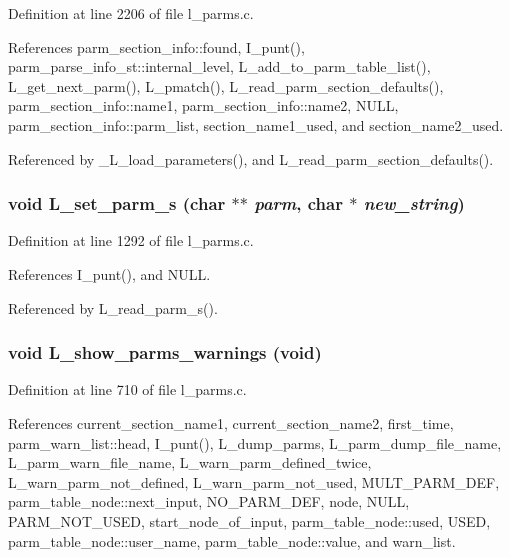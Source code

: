 Definition at line 2206 of file l\_\-parms.c.

References parm\_\-section\_\-info::found, I\_\-punt(), parm\_\-parse\_\-info\_\-st::internal\_\-level, L\_\-add\_\-to\_\-parm\_\-table\_\-list(), L\_\-get\_\-next\_\-parm(), L\_\-pmatch(), L\_\-read\_\-parm\_\-section\_\-defaults(), parm\_\-section\_\-info::name1, parm\_\-section\_\-info::name2, NULL, parm\_\-section\_\-info::parm\_\-list, section\_\-name1\_\-used, and section\_\-name2\_\-used.

Referenced by \_\-L\_\-load\_\-parameters(), and L\_\-read\_\-parm\_\-section\_\-defaults().
\subsubsection{\setlength{\rightskip}{0pt plus 5cm}void L\_\-set\_\-parm\_\-s (char $\ast$$\ast$ {\em parm}, char $\ast$ {\em new\_\-string})}\label{l__parms_8c_d2ff90330481ecb555f26f90a1d3c152}




Definition at line 1292 of file l\_\-parms.c.

References I\_\-punt(), and NULL.

Referenced by L\_\-read\_\-parm\_\-s().
\subsubsection{\setlength{\rightskip}{0pt plus 5cm}void L\_\-show\_\-parms\_\-warnings (void)}\label{l__parms_8c_f725b05a5b630bdea7d8b719c8f50f61}




Definition at line 710 of file l\_\-parms.c.

References current\_\-section\_\-name1, current\_\-section\_\-name2, first\_\-time, parm\_\-warn\_\-list::head, I\_\-punt(), L\_\-dump\_\-parms, L\_\-parm\_\-dump\_\-file\_\-name, L\_\-parm\_\-warn\_\-file\_\-name, L\_\-warn\_\-parm\_\-defined\_\-twice, L\_\-warn\_\-parm\_\-not\_\-defined, L\_\-warn\_\-parm\_\-not\_\-used, MULT\_\-PARM\_\-DEF, parm\_\-table\_\-node::next\_\-input, NO\_\-PARM\_\-DEF, node, NULL, PARM\_\-NOT\_\-USED, start\_\-node\_\-of\_\-input, parm\_\-table\_\-node::used, USED, parm\_\-table\_\-node::user\_\-name, parm\_\-table\_\-node::value, and warn\_\-list.

